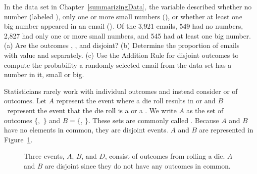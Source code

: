 \begin{exercisewrap}
\begin{nexercise}
In the  data set in Chapter~\ref{summarizingData}, the  variable described whether no number (labeled ), only one or more small numbers (), or whether at least one big number appeared in an email (). Of the 3,921 emails, 549 had no numbers, 2,827 had only one or more small numbers, and 545 had at least one big number. (a) Are the outcomes , , and  disjoint? (b) Determine the proportion of emails with value  and  separately. (c) Use the Addition Rule for disjoint outcomes to compute the probability a randomly selected email from the data set has a number in it, small or big.\footnotemark
\end{nexercise}
\end{exercisewrap}


Statisticians rarely work with individual outcomes and instead consider  or  of outcomes. Let $A$ represent the event where a die roll results in  or  and $B$~represent the event that the die roll is a  or a . We write $A$ as the set of outcomes $\{$,~$\}$ and $B=\{$, $\}$. These sets are commonly called . Because $A$ and $B$ have no elements in common, they are disjoint events. $A$ and $B$ are represented in Figure~\ref{disjointSets}.

\begin{figure}[hhh]
\centering
\caption{Three events, $A$, $B$, and $D$, consist of outcomes from rolling a die. $A$ and $B$ are disjoint since they do not have any outcomes in common.}
\label{disjointSets}
\end{figure}

